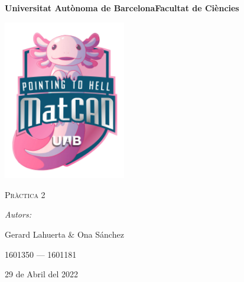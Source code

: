 \documentclass[a4paper, 11pt]{article}
\begin{document}
\begin{titlepage}
    \centering
    {\bfseries\LARGE Universitat Autònoma de Barcelona\newline Facultat de Ciències\par}
    \vspace{2cm}
    {\hspace{-1em}\includegraphics[width=0.4\textwidth]{logo.png}\par}
    \vspace{1cm}
    {\scshape\Huge Pràctica 2\par} 
    \vspace{1cm}
    {\Large \itshape Autors: \par}
    {\Large \hspace{-1.75em} Gerard Lahuerta \& Ona Sánchez \par}
    {\Large 1601350 --- 1601181 \par}
    \vspace{1cm}
    {\Large 29 de Abril del 2022\par}
\end{titlepage}

\justifying

\newpage
\setcounter{page}{2}
\pagestyle{plain}
\tableofcontents
\cleardoublepage
{}
\newpage
\end{document}
